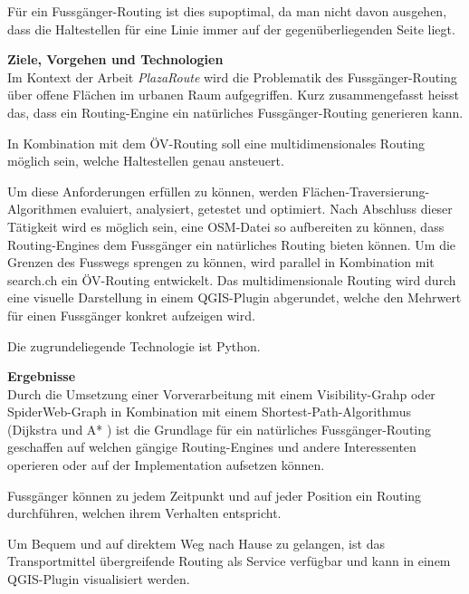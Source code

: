 
Für ein Fussgänger-Routing ist dies supoptimal, da man nicht davon ausgehen, dass die Haltestellen für eine Linie immer auf der gegenüberliegenden Seite liegt.

\textbf{Ziele, Vorgehen und Technologien}~\\
Im Kontext der Arbeit \emph{PlazaRoute} wird die Problematik des Fussgänger-Routing über offene Flächen im urbanen Raum aufgegriffen. Kurz zusammengefasst heisst das, dass ein Routing-Engine ein natürliches Fussgänger-Routing generieren kann.

In Kombination mit dem ÖV-Routing soll eine multidimensionales Routing möglich sein, welche Haltestellen genau ansteuert.

Um diese Anforderungen erfüllen zu können, werden Flächen-Traversierung-Algorithmen evaluiert, analysiert, getestet und optimiert. Nach Abschluss dieser Tätigkeit wird es möglich sein, eine \ac{OSM}-Datei so aufbereiten zu können, dass Routing-Engines dem Fussgänger ein natürliches Routing bieten können. Um die Grenzen des Fusswegs sprengen zu können, wird parallel in Kombination mit search.ch \cite{search_ch_route_api} ein ÖV-Routing entwickelt. Das multidimensionale Routing wird durch eine visuelle Darstellung in einem QGIS-Plugin abgerundet, welche den Mehrwert für einen Fussgänger konkret aufzeigen wird.

Die zugrundeliegende Technologie ist Python.

\textbf{Ergebnisse}~\\
Durch die Umsetzung einer Vorverarbeitung mit einem Visibility-Grahp oder SpiderWeb-Graph in Kombination mit einem Shortest-Path-Algorithmus (Dijkstra \cite{dijkstra_algorithm} und A* \cite{astar}) ist die Grundlage für ein natürliches Fussgänger-Routing geschaffen auf welchen gängige Routing-Engines und andere Interessenten operieren oder auf der Implementation aufsetzen können.

Fussgänger können zu jedem Zeitpunkt und auf jeder Position ein Routing durchführen, welchen ihrem Verhalten entspricht.


Um Bequem und auf direktem Weg nach Hause zu gelangen, ist das Transportmittel übergreifende Routing als Service verfügbar und kann in einem QGIS-Plugin visualisiert werden.

